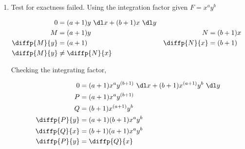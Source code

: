 \begin{enumerate}
          \begin{figure}[H]
              \centering
          \end{figure}

    \item Test for exactness failed. Using the integration factor given $ F = x^{a}y^{b} $

          \begin{align}
              0            & = (a+1)y\ \dl x + (b+1)x\ \dl y                           \\
              M            & = (a+1)y                        & N            & = (b+1)x \\
              \diffp{M}{y} & = (a+1)                         & \diffp{N}{x} & = (b+1)  \\
              \diffp{M}{y} & \neq \diffp{N}{x}
          \end{align}

          Checking the integrating factor,

          \begin{align}
              0            & = (a+1)x^{a}y^{(b+1)}\ \dl x + (b+1)x^{(a+1)}y^{b}\ \dl y \\
              P            & = (a+1)x^{a}y^{(b+1)}                                     \\
              Q            & = (b+1)x^{(a+1)}y^{b}                                     \\
              \diffp{P}{y} & = (a+1)(b+1)x^{a}y^{b}                                    \\
              \diffp{Q}{x} & = (b+1)(a+1)x^{a}y^{b}                                    \\
              \diffp{P}{y} & = \diffp{Q}{x}
          \end{align}


\end{enumerate}
